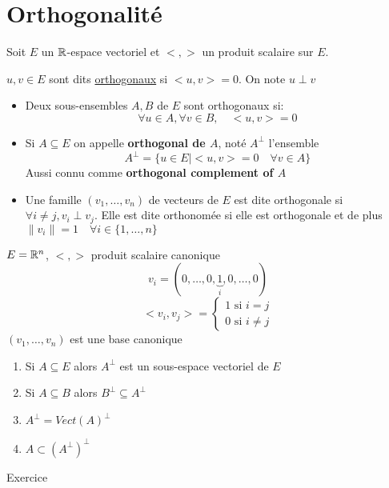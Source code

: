 \section{Orthogonalité}
Soit $E$ un  $\mathbb{R}$-espace vectoriel et  $< , >$ un produit scalaire sur  $E$.
\begin{definition}\label{def:orthogonal}
     $u, v \in E$ sont dits \underline{orthogonaux} si  $<u, v> = 0$. On note  $u \perp v$
      \begin{itemize}
         \item Deux sous-ensembles $A, B$ de  $E$ sont orthogonaux si:
              \[
             \forall u \in A, \forall v \in B, \quad <u, v> = 0
             \] 
         \item Si $A \subseteq E$ on appelle \textbf{orthogonal de $A$}, noté  $A^{\perp}$ l'ensemble
              \[
                  A^{\perp} = \{ u \in E \mid <u, v> = 0 \quad \forall v \in A \}
             \] 
             Aussi connu comme \textbf{orthogonal complement of $A$}
         \item Une famille $(v_1, \ldots, v_n)$ de vecteurs de $E$ est dite orthogonale si  $\forall i \neq j, v_i \perp v_j$. Elle est dite orthonomée si elle est orthogonale et de plus $\|v_i\| = 1 \quad \forall i \in \{ 1, \ldots, n \}$
     \end{itemize}
\end{definition}
\begin{eg}
   $E = \mathbb{R}^n$,  $< , >$ produit scalaire canonique 
   \[
       v_i = (0, \ldots, 0, \underbrace{1}_{i}, 0, \ldots, 0)
   \] 
   \[
   <v_i, v_j> = \begin{cases}
       1 \text{ si } i = j\\  
       0 \text{ si } i \neq  j
   \end{cases}
   \] 
   $(v_1, \ldots, v_n)$ est une base canonique
\end{eg}
\begin{prop}
    \begin{enumerate}
        \item 
            Si $A \subseteq E$ alors $A^{\perp}$ est un sous-espace vectoriel de  $E$ 
        \item Si $A \subseteq B$ alors $B^{\perp} \subseteq A^{\perp}$
        \item $A^{\perp} = Vect(A)^{\perp}$
        \item $A \subset (A^{\perp})^{\perp}$ 
    \end{enumerate}
\end{prop}
\begin{explanation}
   Exercice 
\end{explanation}
